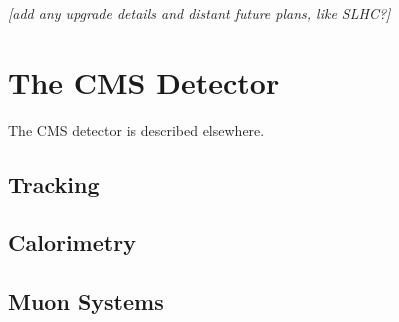 \textit{[add any upgrade details and distant future plans, like SLHC?]}

\section{The CMS Detector}
The CMS detector is described elsewhere. \cite{CMS}

\subsection{Tracking}

\subsection{Calorimetry}

\subsection{Muon Systems}



